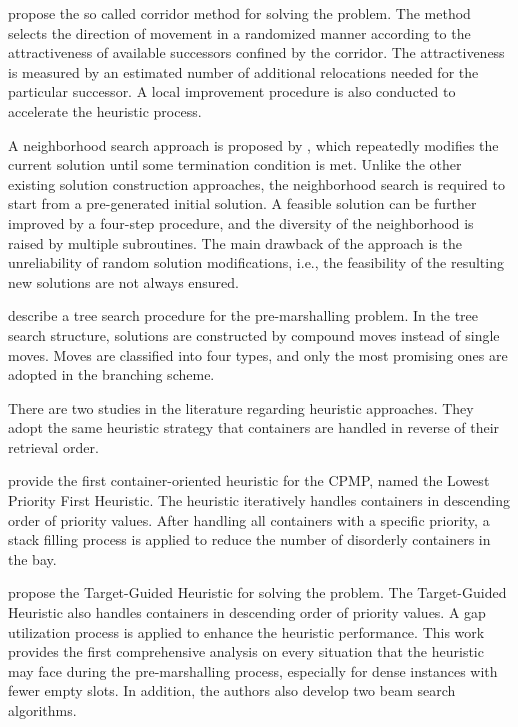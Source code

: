 \documentclass{article}
\begin{document}
\cite{Caserta2009CPMP} propose the so called corridor method for solving the problem. The method selects the direction of movement in a randomized manner according to the attractiveness of available successors confined by the corridor. The attractiveness is measured by an estimated number of additional relocations needed for the particular successor.
A local improvement procedure is also conducted to accelerate the heuristic process.


A neighborhood search approach is proposed by \cite{Lee2009468}, which repeatedly modifies the current solution until some termination condition is met. Unlike the other existing solution construction approaches, the neighborhood search is required to start from a pre-generated initial solution. 
A feasible solution can be further improved by a four-step procedure, and the diversity of the neighborhood is raised by multiple subroutines. The main drawback of the approach is the unreliability of random solution modifications, i.e., the feasibility of the resulting new solutions are not always ensured.


\cite{Bortfeldt2012CPMP} describe a tree search procedure for the pre-marshalling problem.
In the tree search structure, solutions are constructed by compound moves  instead of single moves. Moves are classified into four types, and only the most promising ones are adopted in the branching scheme.

There are two studies in the literature regarding heuristic approaches. They adopt the same heuristic strategy that containers are handled in reverse of their retrieval order.

\cite{ExpositoIzquierdo20128337} provide the first container-oriented heuristic for the CPMP, named the Lowest Priority First Heuristic. The heuristic iteratively handles containers in descending order of priority values. After handling all containers with a specific priority, a stack filling process is applied to reduce the number of disorderly containers in the bay.

\cite{Wang201567} propose the Target-Guided Heuristic for solving the problem. The Target-Guided Heuristic also handles containers in descending order of priority values. A gap utilization process is applied to enhance the heuristic performance. This work provides the first comprehensive analysis on every situation that the heuristic may face during the pre-marshalling process, especially for dense instances with fewer empty slots. In addition, the authors also develop two beam search algorithms.
\end{document}
